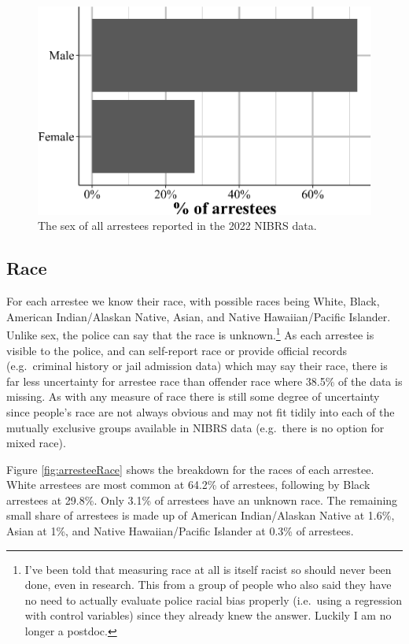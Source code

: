 \documentclass[
  12pt,
  openany]{book}
\begin{document}
\begin{figure}

{\centering \includegraphics[width=0.9\linewidth]{16_nibrs_arrestee_files/figure-latex/arresteeSex-1} 

}

\caption{The sex of all arrestees reported in the 2022 NIBRS data.}\label{fig:arresteeSex}
\end{figure}

\subsection{Race}\label{race-4}

For each arrestee we know their race, with possible races being White, Black, American Indian/Alaskan Native, Asian, and Native Hawaiian/Pacific Islander. Unlike sex, the police can say that the race is unknown.\footnote{I've been told that measuring race at all is itself racist so should never been done, even in research. This from a group of people who also said they have no need to actually evaluate police racial bias properly (i.e.~using a regression with control variables) since they already knew the answer. Luckily I am no longer a postdoc.} As each arrestee is visible to the police, and can self-report race or provide official records (e.g.~criminal history or jail admission data) which may say their race, there is far less uncertainty for arrestee race than offender race where 38.5\% of the data is missing. As with any measure of race there is still some degree of uncertainty since people's race are not always obvious and may not fit tidily into each of the mutually exclusive groups available in NIBRS data (e.g.~there is no option for mixed race).

Figure \ref{fig:arresteeRace} shows the breakdown for the races of each arrestee. White arrestees are most common at 64.2\% of arrestees, following by Black arrestees at 29.8\%. Only 3.1\% of arrestees have an unknown race. The remaining small share of arrestees is made up of American Indian/Alaskan Native at 1.6\%, Asian at 1\%, and Native Hawaiian/Pacific Islander at 0.3\% of arrestees.
\end{document}
